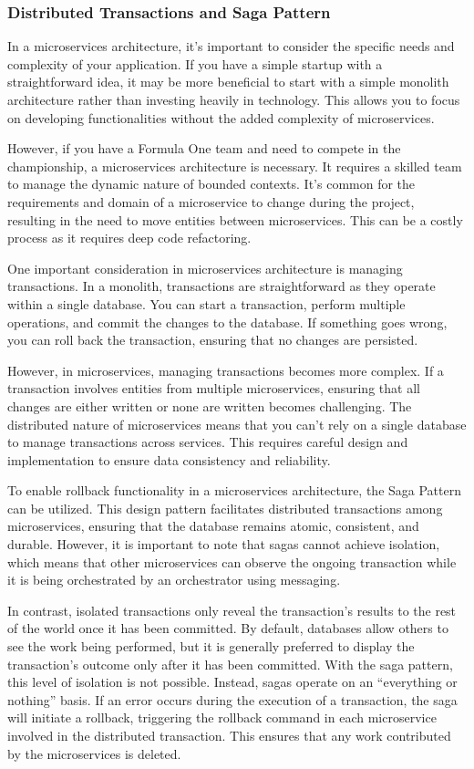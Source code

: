 \subsubsection{Distributed Transactions and Saga Pattern}

In a microservices architecture, it's important to consider the specific
needs and complexity of your application. If you have a simple startup
with a straightforward idea, it may be more beneficial to start with a
simple monolith architecture rather than investing heavily in
technology. This allows you to focus on developing functionalities
without the added complexity of microservices.

However, if you have a Formula One team and need to compete in the
championship, a microservices architecture is necessary. It requires a
skilled team to manage the dynamic nature of bounded contexts. It's
common for the requirements and domain of a microservice to change
during the project, resulting in the need to move entities between
microservices. This can be a costly process as it requires deep code
refactoring.

One important consideration in microservices architecture is managing
transactions. In a monolith, transactions are straightforward as they
operate within a single database. You can start a transaction, perform
multiple operations, and commit the changes to the database. If
something goes wrong, you can roll back the transaction, ensuring that
no changes are persisted.

However, in microservices, managing transactions becomes more complex.
If a transaction involves entities from multiple microservices, ensuring
that all changes are either written or none are written becomes
challenging. The distributed nature of microservices means that you
can't rely on a single database to manage transactions across services.
This requires careful design and implementation to ensure data
consistency and reliability.

To enable rollback functionality in a microservices architecture, the
Saga Pattern can be utilized. This design pattern facilitates
distributed transactions among microservices, ensuring that the database
remains atomic, consistent, and durable. However, it is important to
note that sagas cannot achieve isolation, which means that other
microservices can observe the ongoing transaction while it is being
orchestrated by an orchestrator using messaging.

In contrast, isolated transactions only reveal the transaction's results
to the rest of the world once it has been committed. By default,
databases allow others to see the work being performed, but it is
generally preferred to display the transaction's outcome only after it
has been committed. With the saga pattern, this level of isolation is
not possible. Instead, sagas operate on an ``everything or nothing''
basis. If an error occurs during the execution of a transaction, the
saga will initiate a rollback, triggering the rollback command in each
microservice involved in the distributed transaction. This ensures that
any work contributed by the microservices is deleted.

